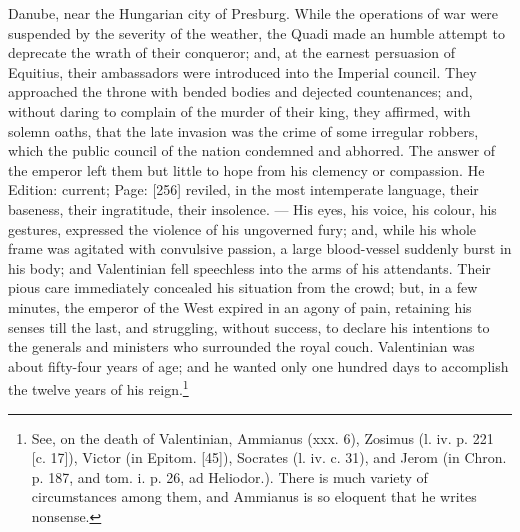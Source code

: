 Danube, near the Hungarian city of Presburg. While the operations of war were suspended by the severity of the weather, the Quadi made an humble attempt to deprecate the wrath of their conqueror; and, at the earnest persuasion of Equitius, their ambassadors were introduced into the Imperial council. They approached the throne with bended bodies and dejected countenances; and, without daring to complain of the murder of their king, they affirmed, with solemn oaths, that the late invasion was the crime of some irregular robbers, which the public council of the nation condemned and abhorred. The answer of the emperor left them but little to hope from his clemency or compassion. He Edition: current; Page: [256] reviled, in the most intemperate language, their baseness, their ingratitude, their insolence. \texthebrew{—} His eyes, his voice, his colour, his gestures, expressed the violence of his ungoverned fury; and, while his whole frame was agitated with convulsive passion, a large blood-vessel suddenly burst in his body; and Valentinian fell speechless into the arms of his attendants. Their pious care immediately concealed his situation from the crowd; but, in a few minutes, the emperor of the West expired in an agony of pain, retaining his senses till the last, and struggling, without success, to declare his intentions to the generals and ministers who surrounded the royal couch. Valentinian was about fifty-four years of age; and he wanted only one hundred days to accomplish the twelve years of his reign.\footnote{See, on the death of Valentinian, Ammianus (xxx. 6), Zosimus (l. iv. p. 221 [c. 17]), Victor (in Epitom. [45]), Socrates (l. iv. c. 31), and Jerom (in Chron. p. 187, and tom. i. p. 26, ad Heliodor.). There is much variety of circumstances among them, and Ammianus is so eloquent that he writes nonsense.}

